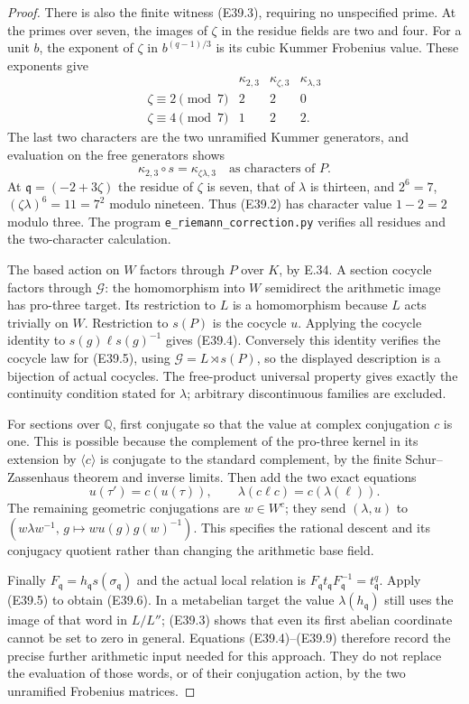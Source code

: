 \begin{proof}
There is also the finite witness (E39.3), requiring no
unspecified prime. At the primes over seven, the images
of $\zeta$ in the residue fields are two and four.
For a unit $b$, the exponent of $\zeta$ in
$b^{(q-1)/3}$ is its cubic Kummer Frobenius value. These
exponents give
\[
 \begin{array}{c|ccc}
    &\kappa_{2,3}&\kappa_{\zeta,3}&\kappa_{\lambda,3}\\\hline
 \zeta\equiv2\pmod7&2&2&0\\
 \zeta\equiv4\pmod7&1&2&2.
 \end{array}
 \tag{E39.7}
\]
The last two characters are the two unramified Kummer
generators, and evaluation on the free generators shows
\[
   \kappa_{2,3}\circ s=\kappa_{\zeta\lambda,3}
          \quad\text{as characters of }P.
 \tag{E39.8}
\]
At $\mathfrak q=(-2+3\zeta)$ the residue of $\zeta$ is
seven, that of $\lambda$ is thirteen, and
$2^6=7$, $(\zeta\lambda)^6=11=7^2$ modulo nineteen.
Thus (E39.2) has character value $1-2=2$ modulo three.
The program \texttt{e\_riemann\_correction.py} verifies
all residues and the two-character calculation.

The based action on $W$ factors through $P$ over $K$,
by E.34. A section cocycle factors through
$\mathcal G$: the homomorphism into $W$ semidirect
the arithmetic image has pro-three target. Its
restriction to $L$ is a homomorphism because $L$ acts
trivially on $W$. Restriction to $s(P)$ is the cocycle
$u$. Applying the cocycle identity to $s(g)\ell s(g)^{-1}$
gives (E39.4). Conversely this identity verifies the
cocycle law for (E39.5), using
$\mathcal G=L\rtimes s(P)$, so the displayed description
is a bijection of actual cocycles. The free-product
universal property gives exactly the continuity
condition stated for $\lambda$; arbitrary discontinuous
families are excluded.

For sections over $\mathbb Q$, first conjugate so that
the value at complex conjugation $c$ is one. This is
possible because the complement of the pro-three kernel
in its extension by $\langle c\rangle$ is conjugate
to the standard complement, by the finite
Schur--Zassenhaus theorem and inverse limits.
Then add the two exact equations
\[
  u(\tau')=c(u(\tau)),\qquad
  \lambda(c\ell c)=c(\lambda(\ell)).
 \tag{E39.9}
\]
The remaining geometric conjugations are $w\in W^c$;
they send $(\lambda,u)$ to
$(w\lambda w^{-1},\,g\mapsto w u(g)g(w)^{-1})$.
This specifies the rational descent and its conjugacy
quotient rather than changing the arithmetic base field.

Finally $F_{\mathfrak q}=h_{\mathfrak q}s(\sigma_{\mathfrak q})$
and the actual local relation is
$F_{\mathfrak q}t_{\mathfrak q}F_{\mathfrak q}^{-1}
=t_{\mathfrak q}^q$. Apply (E39.5) to obtain (E39.6).
In a metabelian target the value $\lambda(h_{\mathfrak q})$
still uses the image of that word in $L/L''$; (E39.3)
shows that even its first abelian coordinate cannot
be set to zero in general. Equations (E39.4)--(E39.9)
therefore record the precise further arithmetic input
needed for this approach. They do not replace the
evaluation of those words, or of their conjugation
action, by the two unramified Frobenius matrices.
\end{proof}

